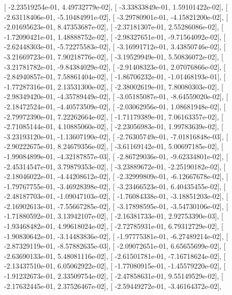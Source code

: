 \documentclass{article}
\begin{document}
       [ -2.23519254e-01,   4.49732779e-02],
       [ -3.33833849e-01,   1.59101422e-02],
       [ -2.63118406e-01,  -5.10484991e-02],
       [ -3.29780901e-01,  -4.15821200e-02],
       [ -2.01695623e-01,   8.47353687e-02],
       [ -2.37181307e-01,   2.55286086e-02],
       [ -1.72090421e-01,   1.48888752e-02],
       [ -2.98327651e-01,  -9.71564092e-02],
       [ -2.62448303e-01,  -5.72275583e-02],
       [ -3.16991712e-01,   3.43850746e-02],
       [ -3.21669723e-01,   7.90218776e-02],
       [ -3.19529949e-01,   5.50836072e-02],
       [ -3.21781782e-01,  -9.84384029e-02],
       [ -2.91408323e-01,   2.07076866e-02],
       [ -2.84940857e-01,   7.58861404e-02],
       [ -1.86706232e-01,  -1.01468193e-01],
       [ -1.77287316e-01,   2.13531300e-02],
       [ -2.38002619e-01,   7.80080303e-02],
       [ -2.98349420e-01,  -4.35789449e-02],
       [ -3.05185087e-01,  -8.64559020e-02],
       [ -2.18472524e-01,  -4.40573509e-02],
       [ -2.03062956e-01,   1.08681948e-02],
       [ -2.79972390e-01,   7.22262664e-02],
       [ -1.71179389e-01,   7.06163357e-02],
       [ -2.71085144e-01,   4.10885060e-02],
       [ -2.23056983e-01,   1.99783639e-02],
       [ -3.23193120e-01,  -1.13607190e-02],
       [ -2.76305749e-01,  -7.01816848e-03],
       [ -2.90222675e-01,   8.24679356e-02],
       [ -3.61169142e-01,   5.00697185e-02],
       [ -1.99084899e-01,  -4.32187857e-03],
       [ -2.86729036e-01,  -9.62334801e-02],
       [ -2.45314547e-01,   3.79879353e-02],
       [ -3.23889672e-01,  -2.25190182e-02],
       [ -2.18046022e-01,  -4.44208612e-02],
       [ -2.32999809e-01,  -6.12667678e-02],
       [ -1.79767755e-01,  -3.46928398e-02],
       [ -3.23466523e-01,   6.40435455e-02],
       [ -2.48187703e-01,  -1.09047103e-02],
       [ -1.76084338e-01,  -3.18851203e-02],
       [ -2.16902613e-01,  -7.55667285e-02],
       [ -3.17898595e-01,  -3.54730106e-02],
       [ -1.71880592e-01,   3.13942107e-02],
       [ -2.16381733e-01,   2.92753390e-03],
       [ -1.93468482e-01,   4.99618024e-02],
       [ -2.72785931e-01,   6.79312729e-02],
       [ -1.90830642e-01,  -3.14483836e-02],
       [ -1.97775381e-01,  -6.27489214e-02],
       [ -2.87329119e-01,  -8.57882635e-03],
       [ -2.09072651e-01,   6.65655699e-02],
       [ -2.63690133e-01,   5.48081116e-02],
       [ -2.61501781e-01,  -7.16718624e-02],
       [ -2.13437510e-01,   6.05062922e-02],
       [ -1.77080915e-01,  -1.45579220e-02],
       [ -1.91232673e-01,   2.33509754e-02],
       [ -2.47858631e-01,   9.55149529e-02],
       [ -2.17632445e-01,   2.37526467e-02],
       [ -2.59449272e-01,  -3.46164372e-02],
\end{document}
